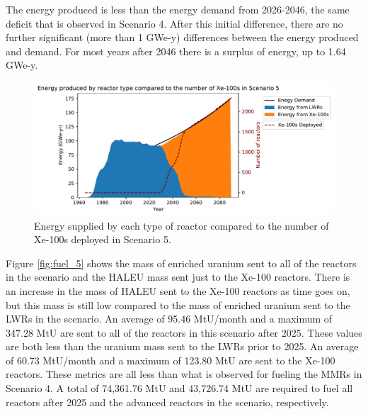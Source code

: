 The energy produced is less than the energy demand from 
2026-2046, the same deficit that is observed in Scenario 4. After this 
initial difference, there are no further significant (more than 
1 GWe-y) differences between 
the energy produced and demand. For most years after 2046 there 
is a surplus of energy, up to 1.64 GWe-y. 

\begin{figure}
    \centering 
    \includegraphics[width=\textwidth]{../figures/energy_scenario5.pdf}
    \caption{Energy supplied by each type of reactor compared to the number of 
    Xe-100s deployed in Scenario 5.}
    \label{fig:energy_rx_5}
\end{figure}

Figure \ref{fig:fuel_5} shows the mass of enriched uranium sent to all of 
the reactors in the scenario and the \gls{HALEU} mass sent just to the 
Xe-100 reactors. There is an increase in the mass of \gls{HALEU} sent 
to the Xe-100 reactors as time goes on, but this mass is still  
low compared to the mass of enriched uranium sent to the \glspl{LWR} in 
the scenario. An average of 95.46 MtU/month and a maximum of 347.28 MtU 
are sent to all of the reactors in this scenario after 2025. These 
values are both less than the uranium mass sent to the 
\glspl{LWR} prior to 2025. An average of 
60.73 MtU/month and a maximum of 123.80 MtU are sent to the Xe-100 reactors. 
These metrics are all less than what is observed 
for fueling the \glspl{MMR} in Scenario 4. A total of 74,361.76 MtU and 
43,726.74 MtU are required to fuel all reactors after 2025 and the advanced reactors 
in the scenario, respectively.


